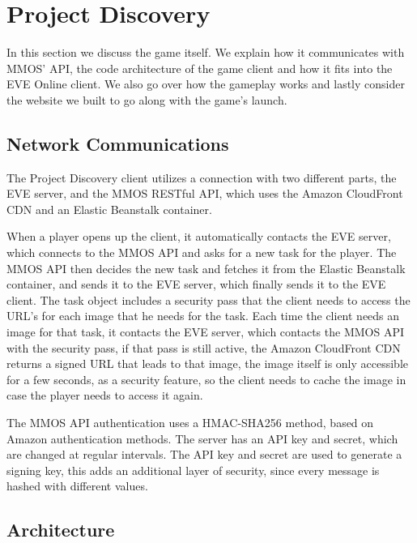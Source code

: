 \section{Project Discovery}\label{sec:projectdiscovery}

	In this section we discuss the game itself. We explain how it communicates with MMOS' API, the code architecture of the game client and how it fits into the EVE Online client. We also go over how the gameplay works and lastly consider the website we built to go along with the game's launch.

\subsection{Network Communications}
	The Project Discovery client utilizes a connection with two different parts, the EVE server, and the MMOS RESTful API, which uses the Amazon CloudFront CDN and an Elastic Beanstalk container.

	When a player opens up the client, it automatically contacts the EVE server, which connects to the MMOS API and asks for a new task for the player. The MMOS API then decides the new task and fetches it from the Elastic Beanstalk container, and sends it to the EVE server, which finally sends it to the EVE client. The task object includes a security pass that the client needs to access the URL's for each image that he needs for the task. Each time the client needs an image for that task, it contacts the EVE server, which contacts the MMOS API with the security pass, if that pass is still active, the Amazon CloudFront CDN returns a signed URL that leads to that image, the image itself is only accessible for a few seconds, as a security feature, so the client needs to cache the image in case the player needs to access it again.

	The MMOS API authentication uses a HMAC-SHA256 method, based on Amazon authentication methods. The server has an API key and secret, which are changed at regular intervals. The API key and secret are used to generate a signing key, this adds an additional layer of security, since every message is hashed with different values.

\subsection{Architecture}


